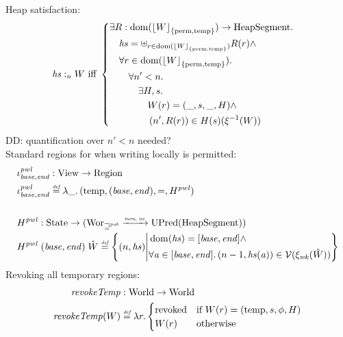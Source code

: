 \documentclass[a4paper]{article}
\DeclarePairedDelimiter\floor{\lfloor}{\rfloor}
\newcommand{\monnefun}{\xrightarrow{\textit{\tiny{mon, ne}}}}
\newcommand{\fun}{\rightarrow}
\newcommand{\defeq}{\stackrel{\textit{\tiny{def}}}{=}}
\DeclareMathOperator{\dom}{dom}
\newcommand\dominique[1]{{\color{purple} \sf \footnotesize {DD: #1}}\\}
\newcommand{\var}[1]{\mathit{#1}}
\newcommand{\hs}{\var{hs}}
\newcommand{\addr}{\var{a}}
\newcommand{\start}{\var{base}}
\newcommand{\addrend}{\var{end}}
\newcommand{\heap}{\var{heap}}
\newcommand{\plainfun}[2]{
  \ifthenelse{\equal{#2}{}}
             {\mathit{#1}}
             {\mathit{#1}(#2)}
}
\newcommand{\revokeTemp}[1]{\plainfun{revokeTemp}{#1}}
\newcommand{\erase}[2]{\floor*{#1}_{\{#2\}}}
\newcommand{\futurewk}{\mathbin{\sqsupseteq}^{\var{pub}}}
\newcommand{\heapSat}[3][\heap]{#1 :_{#2} #3}
\newcommand{\asmType}{\plaindom{AsmType}}
\newcommand{\plaindom}[1]{\mathrm{#1}}
\newcommand{\HeapSegments}{\plaindom{HeapSegment}}
\newcommand{\States}{\plaindom{State}}
\newcommand{\Regions}{\plaindom{Region}}
\newcommand{\Worlds}{\plaindom{World}}
\newcommand{\Wor}{\plaindom{Wor}}
\newcommand{\Worwk}{\Wor_{\futurewk}}
\newcommand{\UPred}[1]{\plaindom{UPred}(#1)}
\newcommand{\Views}{\plaindom{View}}
\newcommand{\intr}[2]{\mathcal{#1}}
\newcommand{\valueintr}[1]{\intr{V}{#1}}
\newcommand{\stdvr}{\valueintr{\asmType}}
\newcommand{\npair}[2][n]{\left(#1,#2 \right)}
\newcommand{\plainview}[1]{\mathrm{#1}}
\newcommand{\perma}{\plainview{perm}}
\newcommand{\temp}{\plainview{temp}}
\newcommand{\revoked}{\plainview{revoked}}
\begin{document}
Heap satisfaction:
\begin{align*}
  &\heapSat[\hs]{n}{W} 
  \text{ iff }
  \left\{\begin{aligned}
    &\exists R : \dom(\erase{W}{\perma,\temp}) \rightarrow \HeapSegments \ldotp \\
    &\quad \hs = \uplus_{r\in\dom(\erase{W}{\perma,\temp})}R(r) \land \\
    &\quad \forall r \in \dom(\erase{W}{\perma,\temp}) \ldotp\\
    &\qquad \forall n'<n \ldotp \\
    &\qquad \quad \exists H,s \ldotp\\
    &\qquad \qquad W(r) = (\_,s,\_,H) \land \\
    &\qquad \qquad \npair[n']{R(r)} \in H(s)(\xi^{-1}(W))\\
  \end{aligned}\right.
\end{align*}
\dominique{quantification over $n' < n$ needed?}

Standard regions for when writing locally is permitted:
\begin{align*}
  &\iota_{\start,\addrend}^{\var{pwl}} : \Views \fun \Regions\\
  &\iota_{\start,\addrend}^{\var{pwl}} \defeq \lambda \_ \ldotp(\temp,(\start,\addrend),=,H^{\var{pwl}}) \\ \\
  &H^{\var{pwl}} : \States \fun (\Worwk \monnefun \UPred{\HeapSegments})\\
  &H^{\var{pwl}} \; (\start,\addrend) \; \hat{W} \defeq \left\{\npair{\hs} \middle|
    \begin{aligned}
      &\dom(\hs) = [\start,\addrend] \land \\
      &\forall \addr \in [\start,\addrend] \ldotp \npair[n-1]{\hs(\addr)} \in \stdvr(\xi_{\var{wk}}(\hat{W}))
    \end{aligned}
  \right\}
\end{align*}
Revoking all temporary regions:
\begin{align*}
  \revokeTemp{} & : \Worlds \fun \Worlds \\
  \revokeTemp{W} & \defeq \lambda r \ldotp 
                   \begin{cases}
                     \revoked            & \text{if }W(r) = (\temp,s,\phi,H) \\
                     W(r)                & \text{otherwise}
                   \end{cases}
\end{align*}
\newcommand{\wrev}[1]{\revokeTemp{#1}}
\end{document}
